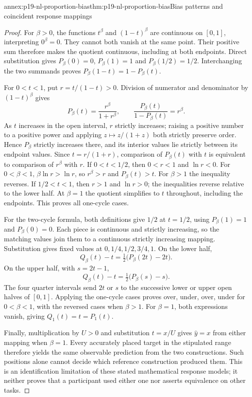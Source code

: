 \begin{annexitem}{annex:p19-nl-proportion-bias}{thm:p19-nl-proportion-bias}{Bias patterns and coincident response mappings}
\begin{proof}
For \(\beta>0\), the functions \(t^\beta\) and
\((1-t)^\beta\) are continuous on \([0,1]\), interpreting
\(0^\beta=0\). They cannot both vanish at the same point.
Their positive sum therefore makes the quotient continuous, including
at both endpoints. Direct substitution gives
\(P_\beta(0)=0\), \(P_\beta(1)=1\) and
\(P_\beta(1/2)=1/2\). Interchanging the two summands proves
\(P_\beta(1-t)=1-P_\beta(t)\).

For \(0<t<1\), put \(r=t/(1-t)>0\). Division of numerator
and denominator by \((1-t)^\beta\) gives
\[
 P_\beta(t)=\frac{r^\beta}{1+r^\beta},\qquad
 \frac{P_\beta(t)}{1-P_\beta(t)}=r^\beta.
\]
As \(t\) increases in the open interval, \(r\) strictly
increases; raising a positive number to a positive power and applying
\(z\mapsto z/(1+z)\) both strictly preserve order. Hence
\(P_\beta\) strictly increases there, and its interior values
lie strictly between its endpoint values.
Since \(t=r/(1+r)\), comparison of \(P_\beta(t)\) with
\(t\) is equivalent to comparison of \(r^\beta\) with \(r\).
If \(0<t<1/2\), then \(0<r<1\) and \(\ln r<0\).
For \(0<\beta<1\), \(\beta\ln r>\ln r\), so
\(r^\beta>r\) and \(P_\beta(t)>t\). For \(\beta>1\)
the inequality reverses. If \(1/2<t<1\), then \(r>1\)
and \(\ln r>0\); the inequalities reverse relative to the
lower half. At \(\beta=1\) the quotient simplifies to \(t\)
throughout, including the endpoints. This proves all one-cycle cases.

For the two-cycle formula, both definitions give \(1/2\) at
\(t=1/2\), using \(P_\beta(1)=1\) and
\(P_\beta(0)=0\). Each piece is continuous and strictly increasing,
so the matching values join them to a continuous strictly increasing
mapping. Substitution gives fixed values at
\(0,1/4,1/2,3/4,1\).
On the lower half,
\[
 Q_\beta(t)-t=\tfrac12\bigl(P_\beta(2t)-2t\bigr).
\]
On the upper half, with \(s=2t-1\),
\[
 Q_\beta(t)-t=\tfrac12\bigl(P_\beta(s)-s\bigr).
\]
The four quarter intervals send \(2t\) or \(s\) to the
successive lower or upper open halves of \([0,1]\). Applying the
one-cycle cases proves over, under, over, under for
\(0<\beta<1\), with the reversed cases when \(\beta>1\).
For \(\beta=1\), both expressions vanish, giving
\(Q_1(t)=t=P_1(t)\).

Finally, multiplication by \(U>0\) and substitution
\(t=x/U\) gives \(\widehat y=x\) from either mapping when
\(\beta=1\). Every accurately placed target in the stipulated
range therefore yields the same observable prediction from the
two constructions. Such positions alone cannot decide which reference
construction produced them. This is an identification limitation of
these stated mathematical response models; it neither proves that a
participant used either one nor asserts equivalence on other tasks.
\end{proof}
\end{annexitem}
